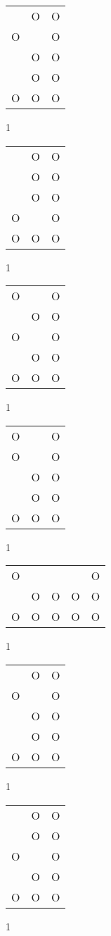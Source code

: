 \begin{tabular}{|m{0.2cm}m{0.2cm}m{0.2cm}|}\hline
 &O&O\\
O& &O\\
 &O&O\\
 &O&O\\
O&O&O\\
\hline\end{tabular}1
\begin{tabular}{|m{0.2cm}m{0.2cm}m{0.2cm}|}\hline
 &O&O\\
 &O&O\\
 &O&O\\
O& &O\\
O&O&O\\
\hline\end{tabular}1
\begin{tabular}{|m{0.2cm}m{0.2cm}m{0.2cm}|}\hline
O& &O\\
 &O&O\\
O& &O\\
 &O&O\\
O&O&O\\
\hline\end{tabular}1
\begin{tabular}{|m{0.2cm}m{0.2cm}m{0.2cm}|}\hline
O& &O\\
O& &O\\
 &O&O\\
 &O&O\\
O&O&O\\
\hline\end{tabular}1
\begin{tabular}{|m{0.2cm}m{0.2cm}m{0.2cm}m{0.2cm}m{0.2cm}|}\hline
O& & & &O\\
 &O&O&O&O\\
O&O&O&O&O\\
\hline\end{tabular}1
\begin{tabular}{|m{0.2cm}m{0.2cm}m{0.2cm}|}\hline
 &O&O\\
O& &O\\
 &O&O\\
 &O&O\\
O&O&O\\
\hline\end{tabular}1
\begin{tabular}{|m{0.2cm}m{0.2cm}m{0.2cm}|}\hline
 &O&O\\
 &O&O\\
O& &O\\
 &O&O\\
O&O&O\\
\hline\end{tabular}1
